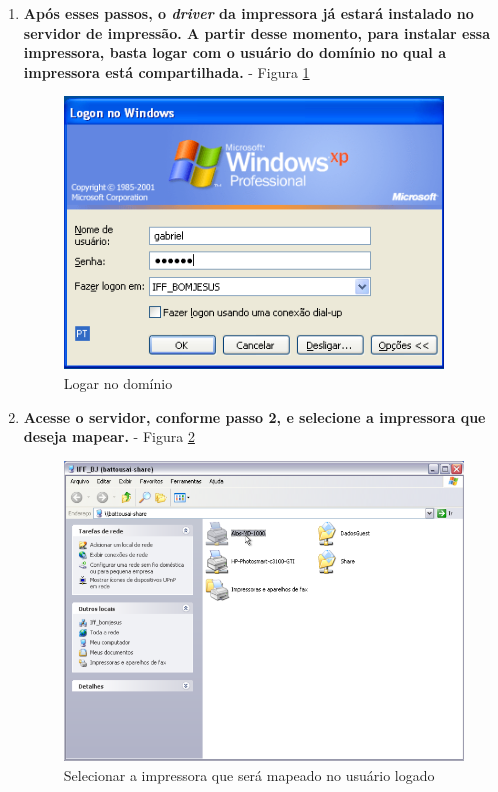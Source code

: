 \begin{enumerate}
	\item \textbf{Após esses passos, o \textit{driver} da impressora já estará instalado no servidor de impressão. A partir desse momento, para instalar essa impressora, basta logar com o usuário do domínio no qual a impressora está compartilhada.} - Figura \ref{login_dominio}
	\begin{figure}[ht]
	   	\centering
	     \includegraphics[width=0.7 \textwidth]{figuras/login_dominio}
	   	\caption{Logar no domínio}
	    \label{login_dominio}
	\end{figure}
	
	
	\item \textbf{Acesse o servidor, conforme passo 2, e selecione a impressora que deseja mapear.} - Figura \ref{selecionar_impressora_servidor}
	\begin{figure}[ht]
	   	\centering
	     \includegraphics[width=0.7 \textwidth]{figuras/selecionar_impressora_servidor}
	   	\caption{Selecionar a impressora que será mapeado no usuário logado}
	    \label{selecionar_impressora_servidor}
	\end{figure}
	
	

\end{enumerate}
